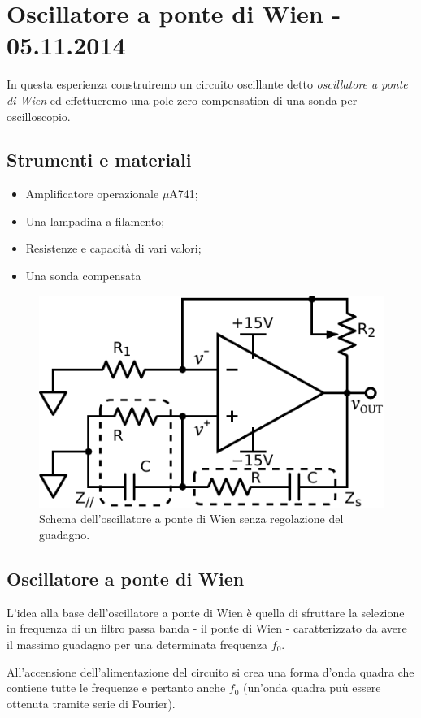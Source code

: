 \section{Oscillatore a ponte di Wien - 05.11.2014}

In questa esperienza construiremo un circuito oscillante detto \textit{oscillatore a ponte di Wien} ed effettueremo una pole-zero compensation di una sonda per oscilloscopio.

\subsection*{Strumenti e materiali}

\begin{itemize} [noitemsep]
		\item Amplificatore operazionale $\mu$A741;
		\item Una lampadina a filamento;
		\item Resistenze e capacità di vari valori;
		\item Una sonda compensata
\end{itemize}

\begin{figure}
\centering
\includegraphics[width=.35\textwidth]{../E08/latex/osc.pdf}
\caption{Schema dell'oscillatore a ponte di Wien senza regolazione del guadagno.}
\label{cir8:without_lamp}
\end{figure}

\subsection{Oscillatore a ponte di Wien}

L'idea alla base dell'oscillatore a ponte di Wien è quella di sfruttare la selezione in frequenza di un filtro passa banda - il ponte di Wien - caratterizzato da avere il massimo guadagno per una determinata frequenza $f_0$.

All'accensione dell'alimentazione del circuito si crea una forma d'onda quadra che contiene tutte le frequenze e pertanto anche $f_0$ (un'onda quadra puù essere ottenuta tramite serie di Fourier).

